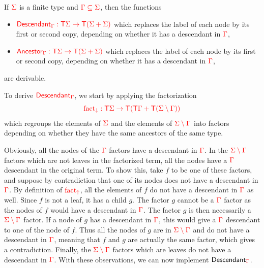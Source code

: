 \noindent\begin{example}\label{ex:descendant} If ${\color{red}{\Sigma}}$ is a finite type and ${\color{red}{{\color{red}{\Gamma}}\subseteq {\color{red}{\Sigma}}}}$, then the functions 
\begin{itemize}
\item ${\color{red}{\mathsf{Descendant}_{\color{red}{\Gamma}}: {\color{red}{\mathsf T}}{\color{red}{\Sigma}}\to {\color{red}{\mathsf T}}({\color{red}{\Sigma}}+{\color{red}{\Sigma}})}}$ which replaces the label of each node by its first or second copy, depending on whether it has a descendant in ${\color{red}{\Gamma}}$,
\item ${\color{red}{\mathsf{Ancestor}_{\color{red}{\Gamma}}: {\color{red}{\mathsf T}}{\color{red}{\Sigma}}\to {\color{red}{\mathsf T}}({\color{red}{\Sigma}}+{\color{red}{\Sigma}})}}$ which replaces the label of each node by its first or second copy, depending on whether it has a descendant in ${\color{red}{\Gamma}}$,
\end{itemize}
are derivable.

To derive ${\color{red}{\mathsf{Descendant}_{\color{red}{\Gamma}}}}$, we start by applying the factorization $${\color{red}{{\color{red}{\mathrm{fact_{\downarrow}}}}: {\color{red}{\mathsf T}}{\color{red}{\Sigma}}\to {\color{red}{\mathsf T}}({\color{red}{\mathsf T}}{\color{red}{\Gamma}}+{\color{red}{\mathsf T}}({\color{red}{\Sigma}}\setminus{\color{red}{\Gamma}}))}}$$ which regroups the elements of ${\color{red}{\Sigma}}$ and the elements of ${\color{red}{{\color{red}{\Sigma}}\setminus{\color{red}{\Gamma}}}}$ into factors depending on whether they have the same ancestors of the same type.

Obviously, all the nodes of the ${\color{red}{\Gamma}}$ factors have a descendant in ${\color{red}{\Gamma}}$. 
In the ${\color{red}{{\color{red}{\Sigma}}\setminus{\color{red}{\Gamma}}}}$ factors which are not leaves in the factorized term, all the nodes have a ${\color{red}{\Gamma}}$ descendant in the original term. To show this, take $f$ to be one of these factors, and suppose by contradiction that one of its nodes does not have a descendant in ${\color{red}{\Gamma}}$. By definition of ${\color{red}{\mathrm{fact_{\uparrow}}}}$, all the elements of $f$ do not have a descendant in ${\color{red}{\Gamma}}$ as well. Since $f$ is not a leaf, it has a child $g$. The factor $g$ cannot be a ${\color{red}{\Gamma}}$
factor as the nodes of $f$ would have a descendant in ${\color{red}{\Gamma}}$. The factor $g$ is then necessarily  a ${\color{red}{{\color{red}{\Sigma}}\setminus {\color{red}{\Gamma}}}}$ factor. If a node of $g$ has a descendant in ${\color{red}{\Gamma}}$, this would give a ${\color{red}{\Gamma}}$ descendant to one of the node of $f$. Thus all the nodes of $g$ are in ${\color{red}{{\color{red}{\Sigma}}\setminus {\color{red}{\Gamma}}}}$ and do not have a descendant in ${\color{red}{\Gamma}}$, meaning that $f$ and $g$ are actually the same factor, which gives a contradiction. Finally, the ${\color{red}{{\color{red}{\Sigma}}\setminus{\color{red}{\Gamma}}}}$ factors which are leaves do not have a descendant in ${\color{red}{\Gamma}}$. With these observations, we can now implement $\mathsf{Descendant}_{\color{red}{\Gamma}}$. 


\end{example}
